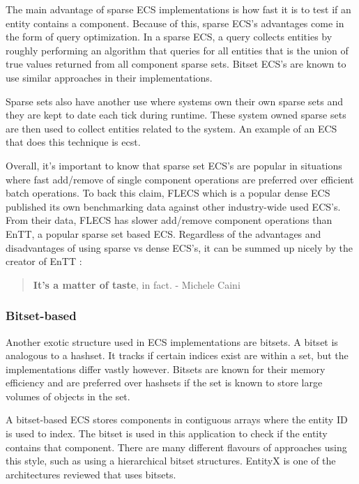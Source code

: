 The main advantage of sparse ECS implementations is how fast it is to test if an entity contains a component. Because of this, sparse ECS's advantages come in the form of query optimization. In a sparse ECS, a query collects entities by roughly performing an algorithm that queries for all entities that is the union of true values returned from all component sparse sets. Bitset ECS's are known to use similar approaches in their implementations.\cite{EnTT_SparseSets}

Sparse sets also have another use where systems own their own sparse sets and they are kept to date each tick during runtime. These system owned sparse sets are then used to collect entities related to the system. An example of an ECS that does this technique is ecst. \cite{ecst}

Overall, it's important to know that sparse set ECS's are popular in situations where fast add/remove of single component operations are preferred over efficient batch operations. To back this claim, FLECS which is a popular dense ECS published its own benchmarking data against other industry-wide used ECS's. From their data, FLECS has slower add/remove component operations than EnTT, a popular sparse set based ECS.\cite{FLECS_EnTTCompare} Regardless of the advantages and disadvantages of using sparse vs dense ECS's, it can be summed up nicely by the creator of EnTT \cite{EnTT_archetype_and_quote}:

\begin{quote}
    \textbf{It’s a matter of taste}, in fact.
        - Michele Caini
\end{quote}

\subsubsection{Bitset-based}
Another exotic structure used in ECS implementations are bitsets. A bitset is analogous to a hashset. It tracks if certain indices exist are within a set, but the implementations differ vastly however. Bitsets are known for their memory efficiency and are preferred over hashsets if the set is known to store large volumes of objects in the set. \cite{Sutherland2014}

A bitset-based ECS stores components in contiguous arrays where the entity ID is used to index. The bitset is used in this application to check if the entity contains that component. There are many different flavours of approaches using this style, such as using a hierarchical bitset structures. \cite{SanderMertensFAQ} EntityX is one of the architectures reviewed that uses bitsets.

